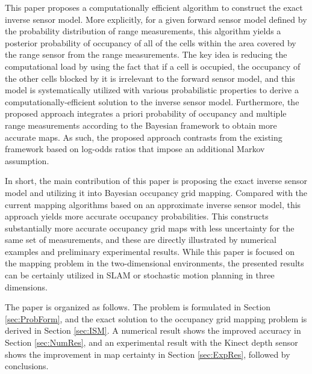 \documentclass[letterpaper, 10pt, conference]{ieeeconf}
\begin{document}
This paper proposes a computationally efficient algorithm to construct the exact inverse sensor model. More explicitly, for a given forward sensor model defined by the probability distribution of range measurements, this algorithm yields a posterior probability of occupancy of all of the cells within the area covered by the range sensor from the range measurements. The key idea is reducing the computational load by using the fact that if a cell is occupied, the occupancy of the other cells blocked by it is irrelevant to the forward sensor model, and this model is systematically utilized with various probabilistic properties to derive a computationally-efficient solution to the inverse sensor model. Furthermore, the proposed approach integrates a priori probability of occupancy and multiple range measurements according to the Bayesian framework to obtain more accurate maps. As such, the proposed approach contrasts from the existing framework based on log-odds ratios that impose an additional Markov assumption. 


In short, the main contribution of this paper is proposing the exact inverse sensor model and utilizing it into Bayesian occupancy grid mapping. Compared with the current mapping algorithms based on an approximate inverse sensor model, this approach yields more accurate occupancy probabilities. This constructs substantially more accurate occupancy grid maps with less uncertainty for the same set of measurements, and these are directly illustrated by numerical examples and preliminary experimental results. While this paper is focused on the mapping problem in the two-dimensional environments, the presented results can be certainly utilized in SLAM or stochastic motion planning in three dimensions.



The paper is organized as follows.
The problem is formulated in Section \ref{sec:ProbForm}, and the exact solution to the occupancy grid mapping problem is derived in Section \ref{sec:ISM}.
A numerical result shows the improved accuracy in Section \ref{sec:NumRes}, and an experimental result with the Kinect depth sensor shows the improvement in map certainty in Section \ref{sec:ExpRes}, followed by conclusions.
\end{document}
